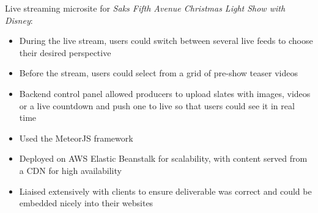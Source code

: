 \item Live streaming microsite for \emph{Saks Fifth Avenue Christmas Light Show with Disney}:
\begin{itemize}%
    \item During the live stream, users could switch between several live feeds to choose their desired perspective
    \item Before the stream, users could select from a grid of pre-show teaser videos
    \item Backend control panel allowed producers to upload slates with images, videos or a live countdown and push one to live so that users could see it in real time
    \item Used the MeteorJS framework
    \item Deployed on AWS Elastic Beanstalk for scalability, with content served from a CDN for high availability
    \item Liaised extensively with clients to ensure deliverable was correct and could be embedded nicely into their websites
\end{itemize}
